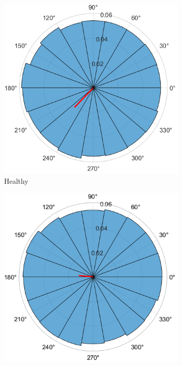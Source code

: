 \documentclass[hidelinks,12pt]{article}
\begin{document}
	
	
	\begin{figure}[bh!]
		\centering
		
		\begin{subfigure}[b]{0.3\textwidth}
			\centering
			\includegraphics[width=\textwidth]{16}
			\caption{Healthy}
		\end{subfigure}
		\hfill
		\begin{subfigure}[b]{0.3\textwidth}
			\centering
			\includegraphics[width=\textwidth]{17}

\end{subfigure}
\end{figure}
\end{document}
